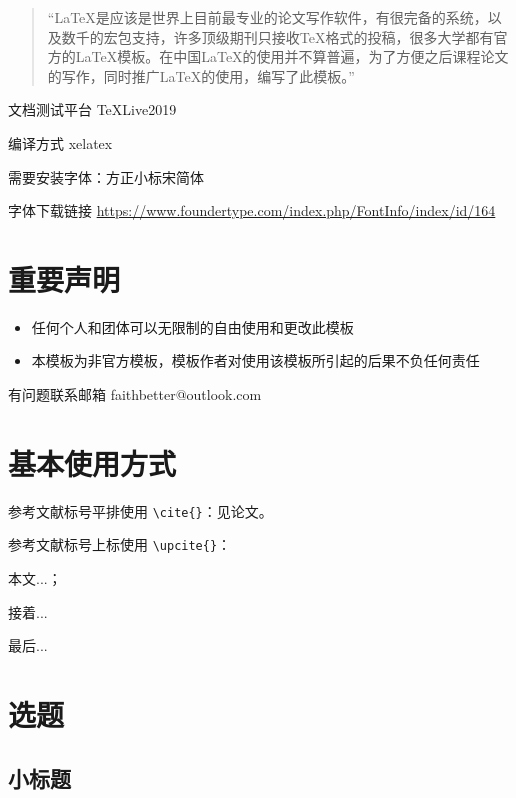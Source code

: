 \documentclass[openright,twoside]{UJS-PhD-thesis}
\begin{document}
\begin{quote}
“\LaTeX{}是应该是世界上目前最专业的论文写作软件，有很完备的系统，以及数千的宏包支持，许多顶级期刊只接收\TeX{}格式的投稿，很多大学都有官方的\LaTeX{}模板。在中国\LaTeX{}的使用并不算普遍，为了方便之后课程论文的写作，同时推广\LaTeX{}的使用，编写了此模板。”
\end{quote}


文档测试平台 TeXLive2019  

编译方式 xelatex

需要安装字体：方正小标宋简体

字体下载链接 \url{https://www.foundertype.com/index.php/FontInfo/index/id/164}

\section{重要声明}

\begin{itemize}
\item 任何个人和团体可以无限制的自由使用和更改此模板
\item 本模板为非官方模板，模板作者对使用该模板所引起的后果不负任何责任
\end{itemize}

有问题联系邮箱 faithbetter@outlook.com

\section{基本使用方式}

参考文献标号平排使用 \verb|\cite{}|：见论文\cite{ref1}。

参考文献标号上标使用 \verb|\upcite{}|：

本文...；

接着...

最后...

\zhlipsum[1-3]     %

\section{选题}

\zhlipsum[1-3]     %

\subsection{小标题}

\zhlipsum[1-3]     %
\end{document}
